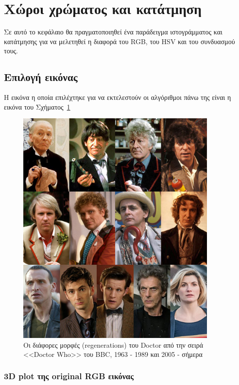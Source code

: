 \label{Chapter1}

\section{Χώροι χρώματος και κατάτμηση}

Σε αυτό το κεφάλαιο θα πραγματοποιηθεί ένα παράδειγμα ιστογράμματος και κατάτμησης για να μελετηθεί η διαφορά του RGB, του HSV και του συνδυασμού τους.

\subsection{Επιλογή εικόνας}

Η εικόνα η οποία επιλέχτηκε για να εκτελεστούν οι αλγόριθμοι πάνω της είναι η εικόνα του Σχήματος~\ref{fig:doctor}

\begin{figure}[H]
  \centering
  \includegraphics[width=100mm]{Figures/the_doctor}
  \caption[Τα 13 regenerations του Doctor]{Οι διάφορες μορφές (regenerations) του Doctor από την σειρά <<Doctor Who>> του BBC, 1963 - 1989 και 2005 - σήμερα}
  \label{fig:doctor}
\end{figure}

\subsubsection{3D plot της original RGB εικόνας}

